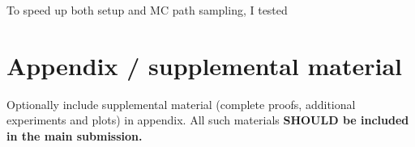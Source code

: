 \documentclass{article}
\begin{document}
To speed up both setup and MC path sampling, I tested 



\medskip





\appendix

\section{Appendix / supplemental material}


Optionally include supplemental material (complete proofs, additional experiments and plots) in appendix.
All such materials \textbf{SHOULD be included in the main submission.}

\end{document}
